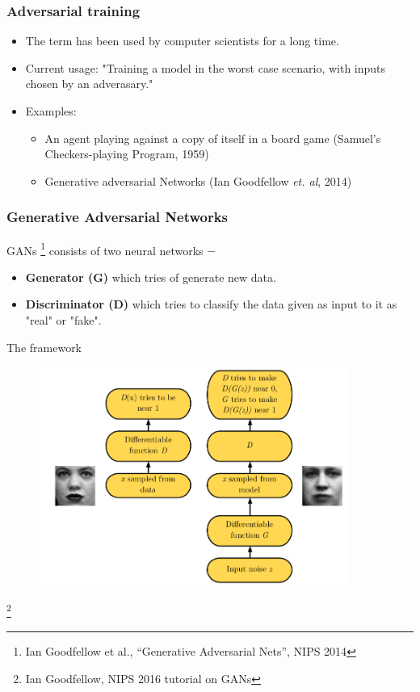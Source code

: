 \documentclass{beamer}
\begin{document}
\begin{frame}
    \frametitle{Adversarial training}
    \begin{itemize}
        \item {The term has been used by computer scientists for a long time.}
        \item {Current usage: "Training a model in the worst case scenario, with inputs chosen 
        by an adverasary."}
        \item {Examples:
        \begin{itemize}
            \item  {An agent playing against a copy of itself in a board game 
            (Samuel's Checkers-playing Program, 1959)}
            \item  {Generative adversarial Networks (Ian Goodfellow \textit{et. al}, 2014)}
        \end{itemize}}
    \end{itemize}
\end{frame}

\begin{frame}
    \frametitle{Generative Adversarial Networks}
    GANs \footnote{Ian Goodfellow et al., “Generative Adversarial Nets”, NIPS 2014} 
    consists of two neural networks $-$
    \begin{itemize}
        \item \textbf{Generator (G)} which tries of generate new data.
        \pause \item \textbf{Discriminator (D)} which tries to classify the data 
        given as input to it as "real" or "fake".
    \end{itemize}
\end{frame}

\begin{frame}{The framework}
    \begin{center}
        \begin{figure}
            \includegraphics[width=0.9\textwidth]{images/advernetfmk.png}
        \end{figure}
    \end{center}
    \footnote{Ian Goodfellow, NIPS 2016 tutorial on GANs}
\end{frame}
\end{document}

